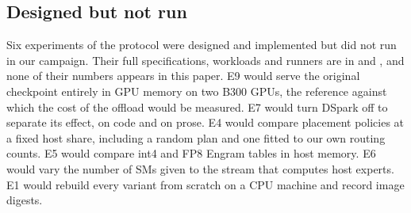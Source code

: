 \subsection{Designed but not run}\label{sec:not-run}
Six experiments of the protocol were designed and implemented but did not run in our campaign. Their full
specifications, workloads and runners are in  and ,
and none of their numbers appears in this paper. E9 would serve the original checkpoint entirely in GPU memory on two
B300 GPUs, the reference against which the cost of the offload would be measured. E7 would turn DSpark off to separate
its effect, on code and on prose. E4 would compare placement policies at a fixed host share, including a random plan
and one fitted to our own routing counts. E5 would compare int4 and FP8 Engram tables in host memory. E6 would vary the
number of SMs given to the stream that computes host experts. E1 would rebuild every variant from scratch on a CPU
machine and record image digests.
